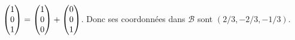 {{$ \begin{pmatrix}1 \cr 0 \cr 1 \cr \end{pmatrix}= \begin{pmatrix}1
\cr 0 \cr 0 \cr \end{pmatrix}+ \begin{pmatrix}0 \cr 0 \cr 1 \cr
\end{pmatrix}$. Donc ses coordonn\' ees dans  $\mathcal{B} $  sont
$(2/3 ,  -2/3  ,  -1/3)$.
}
}
